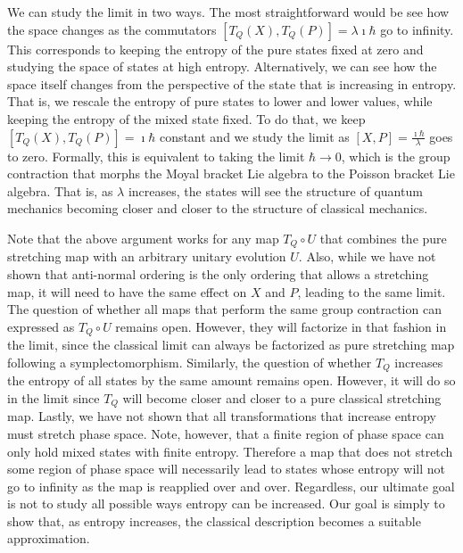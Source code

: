 \documentclass{article}
\begin{document}
We can study the limit in two ways. The most straightforward would be see how the space changes as the commutators $[T_Q(X), T_Q(P)]= \lambda \imath \hbar$ go to infinity. This corresponds to keeping the entropy of the pure states fixed at zero and studying the space of states at high entropy. Alternatively, we can see how the space itself changes from the perspective of the state that is increasing in entropy. That is, we rescale the entropy of pure states to lower and lower values, while keeping the entropy of the mixed state fixed. To do that, we keep $[T_Q(X), T_Q(P)] = \imath \hbar$ constant and we study the limit as $[X, P]= \frac{\imath \hbar}{\lambda}$ goes to zero. Formally, this is equivalent to taking the limit $\hbar \to 0$, which is the group contraction that morphs the Moyal bracket Lie algebra to the Poisson bracket Lie algebra.\cite{saletan1961contraction, inonu1953contraction} That is, as $\lambda$ increases, the states will see the structure of quantum mechanics becoming closer and closer to the structure of classical mechanics.


Note that the above argument works for any map $T_Q \circ U$ that combines the pure stretching map with an arbitrary unitary evolution $U$. Also, while we have not shown that anti-normal ordering is the only ordering that allows a stretching map, it will need to have the same effect on $X$ and $P$, leading to the same limit. The question of whether all maps that perform the same group contraction can expressed as $T_Q \circ U$ remains open. However, they will factorize in that fashion in the limit, since the classical limit can always be factorized as pure stretching map following a symplectomorphism. Similarly, the question of whether $T_Q$ increases the entropy of all states by the same amount remains open. However, it will do so in the limit since $T_Q$ will become closer and closer to a pure classical stretching map. Lastly, we have not shown that all transformations that increase entropy must stretch phase space. Note, however, that a finite region of phase space can only hold mixed states with finite entropy. Therefore a map that does not stretch some region of phase space will necessarily lead to states whose entropy will not go to infinity as the map is reapplied over and over. Regardless, our ultimate goal is not to study all possible ways entropy can be increased. Our goal is simply to show that, as entropy increases, the classical description becomes a suitable approximation.
\end{document}
